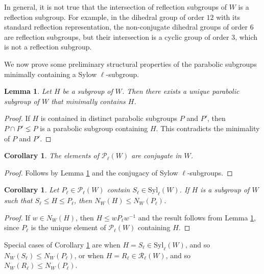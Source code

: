 \documentclass[12pt]{amsart}
\theoremstyle{plain}
\newtheorem{corollary}[theorem]{Corollary}
\newtheorem{lemma}[theorem]{Lemma}
\theoremstyle{definition}
\numberwithin{equation}{section}
\numberwithin{equation}{section}
\begin{document}
	In general, it is not true that the intersection of reflection subgroups of $W$ is a reflection subgroup. For example, in the dihedral group of order $12$ with its standard reflection representation, the non-conjugate dihedral groups of order $6$ are reflection subgroups, but their intersection is a cyclic group of order $3$, which is not a reflection subgroup. 
	
	We now prove some preliminary structural properties of the parabolic subgroups minimally containing a Sylow $\ell$-subgroup.
	
	
	\begin{lemma}\label{lem:nosharing}
		Let $H$ be a subgroup of $W$. Then there exists a unique parabolic subgroup of $W$ that minimally contains $H$.
	\end{lemma}
	
	\begin{proof}
		If $H$ is contained in distinct parabolic subgroups $P$ and $P'$, then $P\cap P'\lneq P$ is a parabolic subgroup containing $H$. This contradicts the minimality of $P$ and $P'$.
	\end{proof}
	
	\begin{corollary}\label{cor:parabolicuniqueclass}
		The elements of $\mathcal{P}_\ell(W)$ are conjugate in $W$.
	\end{corollary}
	
	\begin{proof}
		Follows by Lemma \ref{lem:nosharing} and the conjugacy of Sylow $\ell$-subgroups.
	\end{proof}
	
	\begin{corollary}\label{cor:normalizercontainment}
		Let $P_\ell\in\mathcal{P}_\ell(W)$ contain $S_\ell\in \text{Syl}_\ell(W)$. If $H$ is a subgroup of $W$ such that $S_\ell\leq H\leq P_\ell$, then $N_W(H)\leq N_W(P_\ell)$.
	\end{corollary}
	
	\begin{proof}
		If $w\in N_W(H)$, then $H\leq wP_\ell w^{-1}$ and the result follows from Lemma \ref{lem:nosharing}, since $P_\ell$ is the unique element of $\mathcal{P}_\ell(W)$ containing $H$.
	\end{proof}
	
	Special cases of Corollary \ref{cor:normalizercontainment} are when $H=S_\ell\in \text{Syl}_\ell(W)$, and so $N_W(S_\ell)\leq N_W(P_\ell)$, or when $H=R_\ell\in\mathcal{R}_\ell(W)$, and so $N_W(R_\ell)\leq N_W(P_\ell)$.
	
\end{document}
